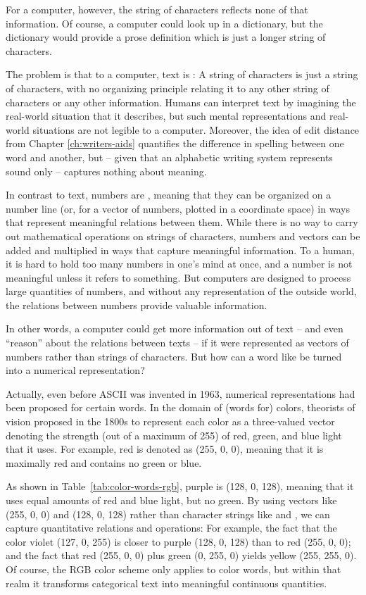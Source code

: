 For a computer, however, the string of characters 
reflects none of that information.  Of course, a computer could look
up  in a dictionary, but the dictionary would provide a
prose definition which is just a longer string of characters.

The problem is that to a computer, text is : A
string of characters is just a string of characters, with no
organizing principle relating it to any other string of characters or
any other information.  Humans can interpret text by imagining the real-world situation that it describes, but such mental representations and real-world situations are not legible
to a computer.  Moreover, the idea of edit distance from Chapter
\ref{ch:writers-aids} quantifies the difference in spelling between
one word and another, but -- given that an alphabetic writing system
represents sound only -- captures nothing about meaning.

In contrast to text, numbers are , meaning that
they can be organized on a number line (or, for a vector of numbers,
plotted in a coordinate space) in ways that represent meaningful
relations between them.  While there is no way to carry out
mathematical operations on strings of characters, numbers and vectors
can be added and multiplied in ways that capture meaningful
information.  To a human, it is hard to hold too many numbers in one's
mind at once, and a number is not meaningful unless it refers to
something.  But computers are designed to process large quantities of
numbers, and without any representation of the outside world, the
relations between numbers provide valuable information.

In other words, a computer could get more information out of text --
and even ``reason'' about the relations between texts -- if it were
represented as vectors of numbers rather than strings of characters.
But how can a word like  be turned into a numerical
representation?

Actually, even before ASCII was invented in 1963, numerical
representations had been proposed for certain words.  In the domain of
(words for) colors, theorists of vision proposed in the 1800s to
represent each color as a three-valued vector denoting the strength
(out of a maximum of 255) of red, green, and blue light that it uses.
For example, red is denoted as (255, 0, 0), meaning that it is
maximally red and contains no green or blue. 

As shown in Table~\ref{tab:color-words-rgb}, purple is (128, 0, 128), meaning that
it uses equal amounts of red and blue light, but no green.  By using
vectors like (255, 0, 0) and (128, 0, 128) rather than character
strings like  and , we can capture
quantitative relations and operations: For example, the fact that the
color violet (127, 0, 255) is closer to purple (128, 0, 128) than to
red (255, 0, 0); and the fact that red (255, 0, 0) plus green (0, 255,
0) yields yellow (255, 255, 0).  Of course, the RGB color scheme only
applies to color words, but within that realm it transforms
categorical text into meaningful continuous quantities.

